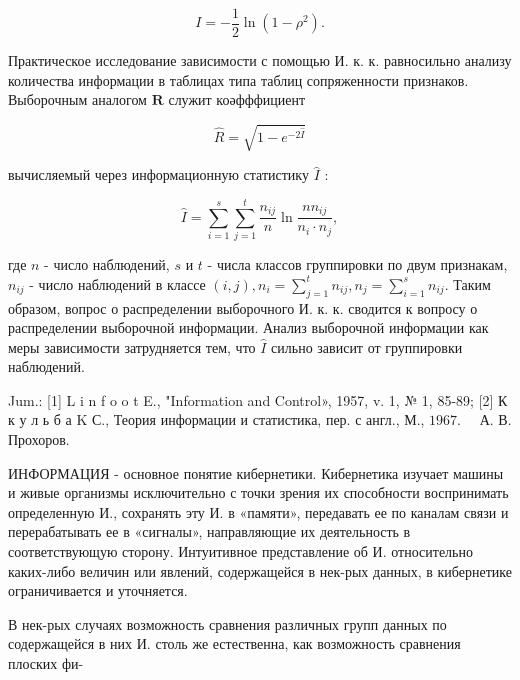 \documentclass[10pt]{article}
\begin{document}
\[

I=-\frac{1}{2} \ln \left(1-\rho^{2}\right) .

\]



Практическое исследование зависимости с помощью И. к. к. равносильно анализу количества информации в таблицах типа таблиц сопряженности признаков. Выборочным аналогом $\boldsymbol{R}$ служит коәфффициент



\[

\hat{R}=\sqrt{1-e^{-2 \hat{I}}}

\]



вычисляемый через информационную статистику $\hat{I}$ :



\[

\hat{I}=\sum_{i=1}^{s} \sum_{j=1}^{t} \frac{n_{i j}}{n} \ln \frac{n n_{i j}}{n_{i} \cdot n_{j}},

\]



где $n$ - число наблюдений, $s$ и $t$ - числа классов группировки по двум признакам, $n_{i j}$ - число наблюдений в классе $(i, j), n_{i}=\sum_{j=1}^{t} n_{i j}, n_{j}=\sum_{i=1}^{s} n_{i j}$. Таким образом, вопрос о распределении выборочного И. к. к. сводится к вопросу о распределении выборочной информации. Анализ выборочной информации как меры зависимости затрудняется тем, что $\widehat{I}$ сильно зависит от группировки наблюдений.



Jum.: [1] L i n f o o t E., "Information and Control», 1957, v. 1, № 1, 85-89; [2] К к у л ь б а K С., Теория информации и статистика, пер. с англ., М., $1967 . \quad$ А. В. Прохоров.



ИНФОРМАЦИЯ - основное понятие кибернетики. Кибернетика изучает машины и живые организмы исключительно с точки зрения их способности воспринимать определенную И., сохранять эту И. в «памяти», передавать ее по каналам связи и перерабатывать ее в «сигналы», направляющие их деятельность в соответствующую сторону. Интуитивное представление об И. относительно каких-либо величин или явлений, содержащейся в нек-рых данных, в кибернетике ограничивается и уточняется.



В нек-рых случаях возможность сравнения различных групп данных по содержащейся в них И. столь же естественна, как возможность сравнения плоских фи-
\end{document}
